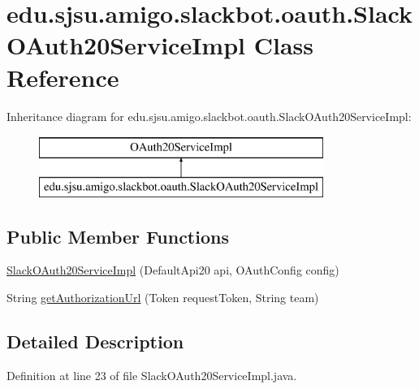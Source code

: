 \hypertarget{classedu_1_1sjsu_1_1amigo_1_1slackbot_1_1oauth_1_1_slack_o_auth20_service_impl}{}\section{edu.\+sjsu.\+amigo.\+slackbot.\+oauth.\+Slack\+O\+Auth20\+Service\+Impl Class Reference}
\label{classedu_1_1sjsu_1_1amigo_1_1slackbot_1_1oauth_1_1_slack_o_auth20_service_impl}
Inheritance diagram for edu.\+sjsu.\+amigo.\+slackbot.\+oauth.\+Slack\+O\+Auth20\+Service\+Impl\+:\begin{figure}[H]
\begin{center}
\leavevmode
\includegraphics[height=2.000000cm]{classedu_1_1sjsu_1_1amigo_1_1slackbot_1_1oauth_1_1_slack_o_auth20_service_impl}
\end{center}
\end{figure}
\subsection*{Public Member Functions}
\begin{DoxyCompactItemize}
\item 
\hyperlink{classedu_1_1sjsu_1_1amigo_1_1slackbot_1_1oauth_1_1_slack_o_auth20_service_impl_a4661fc7c372bd8292e81d2ed508c5e59}{Slack\+O\+Auth20\+Service\+Impl} (Default\+Api20 api, O\+Auth\+Config config)
\item 
String \hyperlink{classedu_1_1sjsu_1_1amigo_1_1slackbot_1_1oauth_1_1_slack_o_auth20_service_impl_a1633d5c63b9f7a0feda03c177fe92df4}{get\+Authorization\+Url} (Token request\+Token, String team)
\end{DoxyCompactItemize}


\subsection{Detailed Description}


Definition at line 23 of file Slack\+O\+Auth20\+Service\+Impl.\+java.



